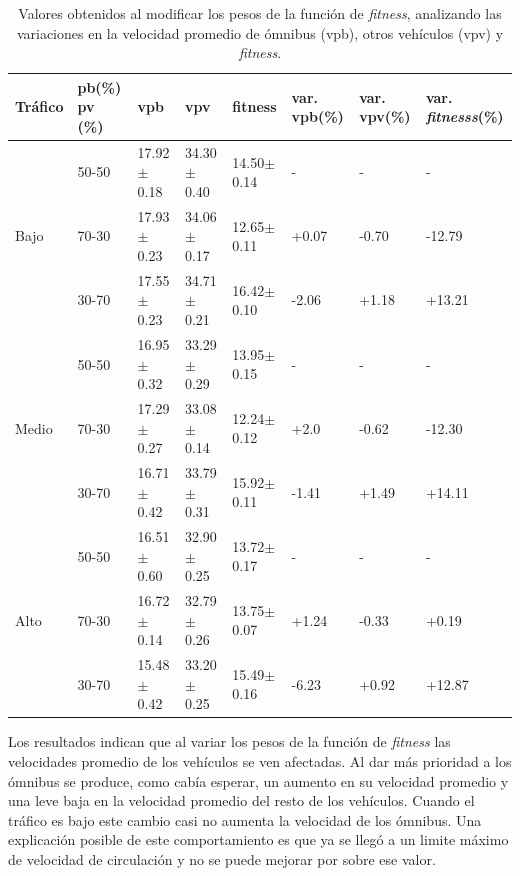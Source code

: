 \begin{table}[H]
	\renewcommand{\arraystretch}{1.2}
	\caption[Valores obtenidos al modificar los pesos de la función de \emph{fitness}.]{Valores obtenidos al modificar los pesos de la función de \emph{fitness}, analizando las variaciones en la velocidad promedio de ómnibus (vpb), otros vehículos (vpv) y \emph{fitness}. }
	\label{table:analisis_fitness}
	\centering
	\begin{tabular}{p{1cm}p{1.2cm}p{1.8cm}p{1.8cm}p{1.8cm}p{1.2cm}p{1.2cm}p{1.2cm} }
		\hline
		Tráfico &
		pb(\%) pv (\%)& 
		vpb & 
		vpv &
		fitness &
		var. \newline vpb(\%) &
		var. \newline vpv(\%) &
		var. \newline \emph{fitnesss}(\%)
		\\ 
		\hline
		& 50-50  & 17.92$\pm$0.18 & 34.30$\pm$0.40 & 14.50$\pm$0.14  &- & - & -\\		
		Bajo & 70-30  & 17.93$\pm$0.23 & 34.06$\pm$0.17 & 12.65$\pm$0.11  & +0.07 & -0.70 & -12.79\\		
		& 30-70 & 17.55$\pm$0.23 & 34.71$\pm$0.21 & 16.42$\pm$0.10  & -2.06 & +1.18 & +13.21\\
		\hline
		
		& 50-50  & 16.95$\pm$0.32 & 33.29$\pm$0.29 & 13.95$\pm$0.15  &- & - & -\\		
		Medio & 70-30  & 17.29$\pm$0.27 & 33.08$\pm$0.14 & 12.24$\pm$0.12  & +2.0 & -0.62 & -12.30\\		
		& 30-70 & 16.71$\pm$0.42 & 33.79$\pm$0.31 & 15.92$\pm$0.11  & -1.41 & +1.49& +14.11\\
		
		\hline
		& 50-50  & 16.51$\pm$0.60 & 32.90$\pm$0.25 & 13.72$\pm$0.17  &- & - & -\\		
		Alto & 70-30  & 16.72$\pm$0.14 & 32.79$\pm$0.26 & 13.75$\pm$0.07  & +1.24 & -0.33 & +0.19\\	
		& 30-70 & 15.48$\pm$0.42 & 33.20$\pm$0.25 & 15.49$\pm$0.16  & -6.23 & +0.92 & +12.87\\
		\hline
	\end{tabular}
\end{table}


Los resultados indican que al variar los pesos de la función de \emph{fitness} las velocidades promedio de los vehículos se ven afectadas. Al dar más prioridad a los ómnibus se produce, como cabía esperar, un aumento en su velocidad promedio y una leve baja en la velocidad promedio del resto de los vehículos. Cuando el tráfico es bajo este cambio casi no aumenta la velocidad de los ómnibus. Una explicación posible de este comportamiento es que ya se llegó a un limite máximo de velocidad de circulación y no se puede mejorar por sobre ese valor.

